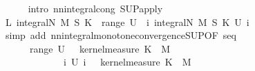 \begin{isabellebody}
\ \ \ \ \isamarkupfalse%
\ {\isacharparenleft}{\kern0pt}intro\ nn{\isacharunderscore}{\kern0pt}integral{\isacharunderscore}{\kern0pt}cong\ SUP{\isacharunderscore}{\kern0pt}apply{\isacharparenright}{\kern0pt}\isanewline
\ \ \isamarkupfalse%
\ \isamarkupfalse%
\ L{\isacharcolon}{\kern0pt}\ {\isachardoublequoteopen}integral\isactrlsup N\ {\isacharparenleft}{\kern0pt}M\ {\isasymOtimes}\isactrlsub S\ K{\isacharparenright}{\kern0pt}\ {\isacharparenleft}{\kern0pt}{\isasymSqunion}\ range\ U{\isacharparenright}{\kern0pt}\ {\isacharequal}{\kern0pt}\ {\isacharparenleft}{\kern0pt}{\isasymSqunion}i{\isachardot}{\kern0pt}\ integral\isactrlsup N\ {\isacharparenleft}{\kern0pt}M\ {\isasymOtimes}\isactrlsub S\ K{\isacharparenright}{\kern0pt}\ {\isacharparenleft}{\kern0pt}U\ i{\isacharparenright}{\kern0pt}{\isacharparenright}{\kern0pt}{\isachardoublequoteclose}\isanewline
\ \ \ \ \isamarkupfalse%
\ {\isacharparenleft}{\kern0pt}simp\ add{\isacharcolon}{\kern0pt}\ nn{\isacharunderscore}{\kern0pt}integral{\isacharunderscore}{\kern0pt}monotone{\isacharunderscore}{\kern0pt}convergence{\isacharunderscore}{\kern0pt}SUP{\isacharbrackleft}{\kern0pt}OF\ seq{\isacharparenleft}{\kern0pt}{}{\isacharparenright}{\kern0pt}\ {}{\isacharbrackright}{\kern0pt}{\isacharparenright}{\kern0pt}\isanewline
\ \ \isamarkupfalse%
\ {\isachardoublequoteopen}{\isacharparenleft}{\kern0pt}{\isasymintegral}\isactrlsup {\isacharplus}{\kern0pt}\ {\isasymomega}\ {\isasymintegral}\isactrlsup {\isacharplus}{\kern0pt}\ {\isasymomega}\ {\isacharparenleft}{\kern0pt}{\isasymSqunion}\ range\ U{\isacharparenright}{\kern0pt}\ {\isacharparenleft}{\kern0pt}{\isasymomega}\ {\isasymomega}\ {\isasympartial}kernel{\isacharunderscore}{\kern0pt}measure\ K\ {\isasymomega}\ {\isasympartial}M{\isacharparenright}{\kern0pt}\ {\isacharequal}{\kern0pt}\isanewline
\ \ \ \ \ \ \ \ \ {\isasymintegral}\isactrlsup {\isacharplus}{\kern0pt}\ {\isasymomega}\ {\isasymintegral}\isactrlsup {\isacharplus}{\kern0pt}\ {\isasymomega}\ {\isacharparenleft}{\kern0pt}{\isasymSqunion}i{\isachardot}{\kern0pt}\ U\ i\ {\isacharparenleft}{\kern0pt}{\isasymomega}\ {\isasymomega}\ {\isasympartial}kernel{\isacharunderscore}{\kern0pt}measure\ K\ {\isasymomega}\ {\isasympartial}M{\isachardoublequoteclose}\isanewline

\end{isabellebody}
